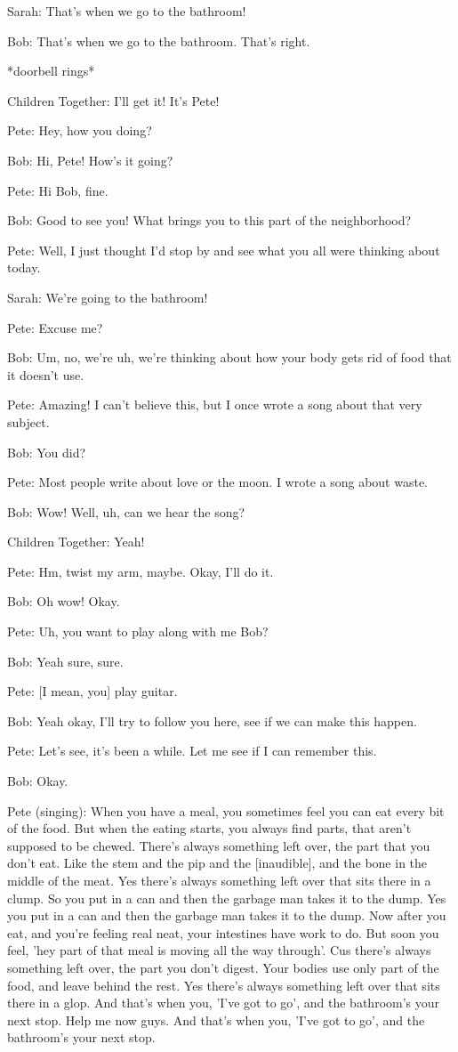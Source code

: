 Sarah: That's when we go to the bathroom!

Bob: That's when we go to the bathroom. That's right.

*doorbell rings*

Children Together: I'll get it! It's Pete!

Pete: Hey, how you doing?

Bob: Hi, Pete! How's it going?

Pete: Hi Bob, fine.

Bob: Good to see you! What brings you to this part of the neighborhood?

Pete: Well, I just thought I'd stop by and see what you all were thinking about today.

Sarah: We're going to the bathroom!

Pete: Excuse me?

Bob: Um, no, we're uh, we're thinking about how your body gets rid of food that it doesn't use.

Pete: Amazing! I can't believe this, but I once wrote a song about that very subject.

Bob: You did?

Pete: Most people write about love or the moon. I wrote a song about waste.

Bob: Wow! Well, uh, can we hear the song?

Children Together: Yeah!

Pete: Hm, twist my arm, maybe. Okay, I'll do it.

Bob: Oh wow! Okay.

Pete: Uh, you want to play along with me Bob?

Bob: Yeah sure, sure.

Pete: [I mean, you] play guitar.

Bob: Yeah okay, I'll try to follow you here, see if we can make this happen.

Pete: Let's see, it's been a while. Let me see if I can remember this.

Bob: Okay.

Pete (singing): When you have a meal, you sometimes feel you can eat every bit of the food. But when the eating starts, you always find parts, that aren't supposed to be chewed. There's always something left over, the part that you don't eat. Like the stem and the pip and the [inaudible], and the bone in the middle of the meat. Yes there's always something left over that sits there in a clump. So you put in a can and then the garbage man takes it to the dump. Yes you put in a can and then the garbage man takes it to the dump. Now after you eat, and you're feeling real neat, your intestines have work to do. But soon you feel, 'hey part of that meal is moving all the way through'. Cus there's always something left over, the part you don't digest. Your bodies use only part of the food, and leave behind the rest. Yes there's always something left over that sits there in a glop. And that's when you, 'I've got to go', and the bathroom's your next stop. Help me now guys. And that's when you, 'I've got to go', and the bathroom's your next stop.

